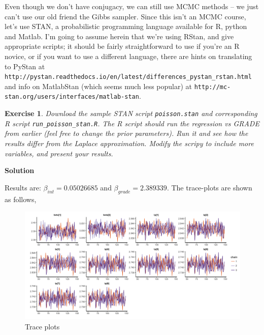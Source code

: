 \documentclass[twoside]{article}
\newcounter{lecnum}
\newtheorem{exercise}{Exercise}[lecnum]
\begin{document}
      Even though we don't have conjugacy, we can still use MCMC methods -- we just can't use our old friend the Gibbs sampler. Since this isn't an MCMC course, let's use STAN, a probabilistic programming language available for R, python and Matlab. I'm going to assume herein that we're using RStan, and give appropriate scripts; it should be fairly straightforward to use if you're an R novice, or if you want to use a different language, there are hints on translating to PyStan at \\ \texttt{http://pystan.readthedocs.io/en/latest/differences\_pystan\_rstan.html} and info on MatlabStan (which seems much less popular) at \texttt{http://mc-stan.org/users/interfaces/matlab-stan}.
  \begin{exercise}
    Download the sample STAN script \texttt{poisson.stan} and corresponding R script \texttt{run\_poisson\_stan.R}. The R script should run the  regression vs GRADE from earlier (feel free to change the prior parameters). Run it and see how the results differ from the Laplace approximation. Modify the scripy to include more variables, and present your results.
  \end{exercise}

{\color{blue}
	\textbf{Solution}
	
	Results are: $\beta_{int} = 0.05026685$ and $\beta_{grade} = 2.389339$. The trace-plots are shown as follows,
	
		\begin{figure}[H]
		\begin{center}
			\includegraphics[width=1.2\linewidth]{Section3R/Figures/P3_9_trace.png}
			\caption{Trace plots}
		\end{center}
	\end{figure}
	
} %

  
  
\end{document}
